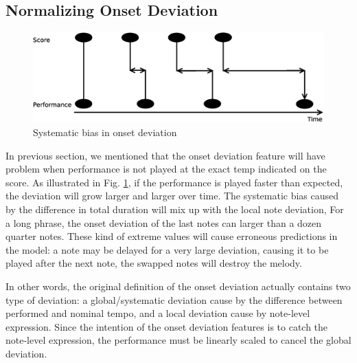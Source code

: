    \subsection{Normalizing Onset Deviation}
   \label{sec:normalize}
\begin{figure}[tp]
   \begin{center}
      \includegraphics[width=\textwidth]{fig/prob_onset_diff}

   \end{center}
   \caption{Systematic bias in onset deviation }
   \label{fig:normalizationprob}
\end{figure}
%
In previous section, we mentioned that the onset deviation feature will have problem when performance is not played at the exact temp indicated on the score. As illustrated in Fig. \ref{fig:normalizationprob}, if the performance is played faster than expected, the deviation will grow larger and larger over time. The systematic bias caused by the difference in total duration will mix up with the local note deviation, For a long phrase, the onset deviation of the last notes can larger than a dozen quarter notes. These kind of extreme values will cause erroneous predictions in the model: a note may be delayed for a very large deviation, causing it to be played after the next note, the swapped notes will destroy the melody.
 
In other words, the original definition of the onset deviation actually contains two type of deviation: a global/systematic deviation cause by the difference between performed and nominal tempo, and a local deviation cause by note-level expression. Since the intention of the onset deviation features is to catch the note-level expression, the performance must be linearly scaled to cancel the global deviation.

